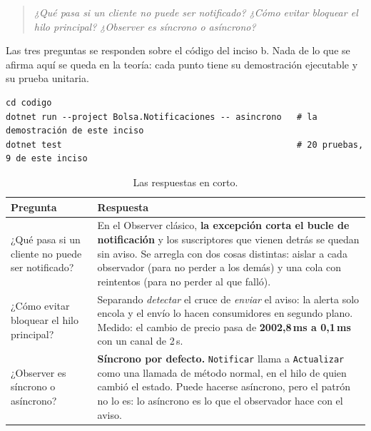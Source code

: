 
\begin{quote}
\itshape
¿Qué pasa si un cliente no puede ser notificado? ¿Cómo evitar bloquear el hilo principal?
¿Observer es síncrono o asíncrono?
\end{quote}

Las tres preguntas se responden sobre el código del inciso b. Nada de lo que se afirma aquí
se queda en la teoría: cada punto tiene su demostración ejecutable y su prueba unitaria.

\begin{lstlisting}[language={}, numbers=none, basicstyle=\ttfamily\footnotesize, columns=fullflexible, keepspaces=true]
cd codigo
dotnet run --project Bolsa.Notificaciones -- asincrono   # la demostración de este inciso
dotnet test                                              # 20 pruebas, 9 de este inciso
\end{lstlisting}

\begin{table}[H]
\centering
\small
\begin{tabularx}{\textwidth}{>{\raggedright\arraybackslash}p{4.3cm} >{\raggedright\arraybackslash}X}
\toprule
\textbf{Pregunta} & \textbf{Respuesta} \\
\midrule
¿Qué pasa si un cliente no puede ser notificado? &
En el Observer clásico, \textbf{la excepción corta el bucle de notificación} y los
suscriptores que vienen detrás se quedan sin aviso. Se arregla con dos cosas distintas:
aislar a cada observador (para no perder a los demás) y una cola con reintentos (para no
perder al que falló). \\
\addlinespace
¿Cómo evitar bloquear el hilo principal? &
Separando \emph{detectar} el cruce de \emph{enviar} el aviso: la alerta solo encola y el
envío lo hacen consumidores en segundo plano. Medido: el cambio de precio pasa de
\textbf{2002,8\,ms a 0,1\,ms} con un canal de 2\,s. \\
\addlinespace
¿Observer es síncrono o asíncrono? &
\textbf{Síncrono por defecto.} \texttt{Notificar} llama a \texttt{Actualizar} como una
llamada de método normal, en el hilo de quien cambió el estado. Puede hacerse asíncrono,
pero el patrón no lo es: lo asíncrono es lo que el observador hace con el aviso. \\
\bottomrule
\end{tabularx}
\caption{Las respuestas en corto.}
\end{table}

